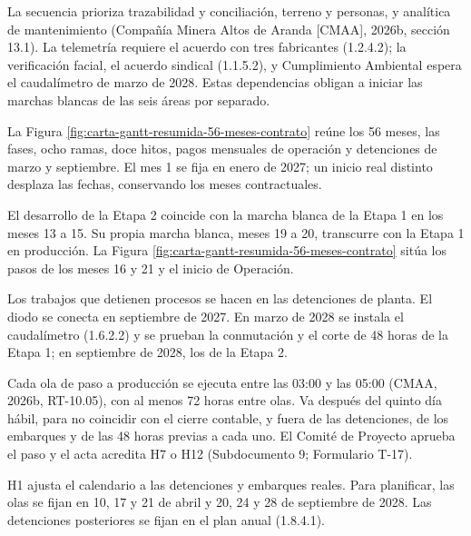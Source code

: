 \documentclass[formulario]{../../comun/overfore}
\begin{document}
La secuencia prioriza trazabilidad y conciliación, terreno y personas, y analítica de mantenimiento (Compañía Minera Altos de Aranda [CMAA], 2026b, sección 13.1). La telemetría requiere el acuerdo con tres fabricantes (1.2.4.2); la verificación facial, el acuerdo sindical (1.1.5.2), y Cumplimiento Ambiental espera el caudalímetro de marzo de 2028. Estas dependencias obligan a iniciar las marchas blancas de las seis áreas por separado.

La Figura \ref{fig:carta-gantt-resumida-56-meses-contrato} reúne los 56 meses, las fases, ocho ramas, doce hitos, pagos mensuales de operación y detenciones de marzo y septiembre. El mes 1 se fija en enero de 2027; un inicio real distinto desplaza las fechas, conservando los meses contractuales.

\begin{horizontal}
El desarrollo de la Etapa 2 coincide con la marcha blanca de la Etapa 1 en los meses 13 a 15. Su propia marcha blanca, meses 19 a 20, transcurre con la Etapa 1 en producción. La Figura \ref{fig:carta-gantt-resumida-56-meses-contrato} sitúa los pasos de los meses 16 y 21 y el inicio de Operación.
\end{horizontal}

Los trabajos que detienen procesos se hacen en las detenciones de planta. El diodo se conecta en septiembre de 2027. En marzo de 2028 se instala el caudalímetro (1.6.2.2) y se prueban la conmutación y el corte de 48 horas de la Etapa 1; en septiembre de 2028, los de la Etapa 2.

Cada ola de paso a producción se ejecuta entre las 03:00 y las 05:00 (CMAA, 2026b, RT-10.05), con al menos 72 horas entre olas. Va después del quinto día hábil, para no coincidir con el cierre contable, y fuera de las detenciones, de los embarques y de las 48 horas previas a cada uno. El Comité de Proyecto aprueba el paso y el acta acredita H7 o H12 (Subdocumento 9; Formulario T-17).

H1 ajusta el calendario a las detenciones y embarques reales. Para planificar, las olas se fijan en 10, 17 y 21 de abril y 20, 24 y 28 de septiembre de 2028. Las detenciones posteriores se fijan en el plan anual (1.8.4.1).
\end{document}
